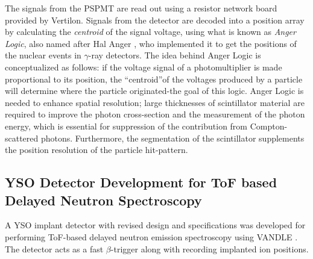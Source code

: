 \documentclass[a4paper,12pt,twoside]{report}
\begin{document}
The signals from the PSPMT are read out using a resistor network board provided by Vertilon. Signals from the detector are decoded into a position array by calculating the \textit{centroid} of the signal voltage, using what is known as \textit{Anger Logic}, also named after Hal Anger \cite{angerlogic}, who implemented it to get the positions of the nuclear events in $\gamma$-ray detectors. The idea behind Anger Logic is conceptualized as follows: if the voltage signal of a photomultiplier is made proportional to its position, the \textquotedblleft  centroid\textquotedblright of the voltages produced by a particle will determine where the particle originated-the goal of this logic. Anger Logic is needed to enhance spatial resolution; large thicknesses of scintillator material are required to improve the photon cross-section and the measurement of the photon energy, which is essential for suppression of the contribution from Compton-scattered photons. Furthermore, the segmentation of the scintillator supplements the position resolution of the particle hit-pattern. 

\subsection{YSO Detector Development for ToF based Delayed Neutron Spectroscopy}
A YSO implant detector with revised design and specifications was developed for performing ToF-based delayed neutron emission spectroscopy using VANDLE \cite{VANDLE}. The detector acts as a fast $\beta$-trigger along with recording implanted ion positions.
\end{document}
